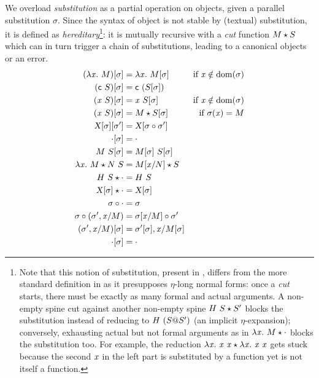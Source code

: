 \documentclass{llncs}
\begin{document}
We overload \emph{substitution} as a partial operation on objects,
given a parallel substitution $\sigma$. Since the syntax of object is
not stable by (textual) substitution, it is defined as
\emph{hereditary}\footnote{ Note that this notion of substitution,
  present in \cite{pfenning2007term}, differs from the more standard
  definition in \cite{hl07mechanizing} as it presupposes $\eta$-long
  normal forms: once a \emph{cut} starts, there must be exactly as
  many formal and actual arguments. A non-empty spine cut against
  another non-empty spine ${{H}\  S}\star{S'}$ blocks the
  substitution instead of reducing to ${H}\  {({S}@{S}')}$ (an
  implicit $\eta$-expansion); conversely, exhausting actual but not
  formal arguments as in ${\lambda{\ensuremath{\text{\textit{x}}}}.\  M}\star{\cdot}$ blocks the
  substitution too. For example, the reduction ${\lambda{\ensuremath{\text{\textit{x}}}}.\  {\text{\textit{x}}}\ {\text{\textit{x}}}}\star{\lambda{\ensuremath{\text{\textit{x}}}}.\ {\ensuremath{\text{\textit{x}}}}\ {\ensuremath{\text{\textit{x}}}}}$ gets stuck
  because the second $\text{\textit{x}}$ in the left part is substituted by a
  function yet is not itself a function. }: it is mutually recursive
with a \emph{cut} function ${M}\star{S}$ which can in turn trigger a
chain of substitutions, leading to a canonical objects or an error.
\begin{align*}
  {(\lambda{\ensuremath{\text{\textit{x}}}}.\ M)}[{\sigma}] &= \lambda{\ensuremath{\text{\textit{x}}}}.\  {{M}[{\sigma}]} &
  \text{if $\text{\textit{x}}\notin \operatorname{dom}{\!(\sigma)}$}
  \\
  {({\text{\textsf{c}}}\  S)}[{\sigma}] &= {\text{\textsf{c}}}\  {({S}[{\sigma}])}
  \\
  {({\text{\textit{x}}}\  S)}[{\sigma}] &=
  {\text{\textit{x}}}\  {{S}[{\sigma}]} &
  \text{if $\text{\textit{x}}\notin \operatorname{dom}{\!(\sigma)}$}
  \\
  {({\text{\textit{x}}}\  S)}[{\sigma}] &=
  {M}\star{{S}[{\sigma}]} &
  \text{if $\sigma(\text{\textit{x}}) = M$}
  \\
  {{\text{\textsl{X}}}[{\sigma}]}[{\sigma'}] &=
  {\text{\textsl{X}}}[{{\sigma}\circ{\sigma'}}]
  \\
  {\cdot}[{\sigma}] &=
  \cdot \\
  {{M}\ {S}}[{\sigma}] &=
  {{M}[{\sigma}]}\ {{S}[{\sigma}]}
  \\
  {\lambda{\ensuremath{\text{\textit{x}}}}.\  M}\star{{N}\ {S}} &=
  {{M}[{{\text{\textit{x}}}/{N}}]}\star{S}
  \\
  {{H}\  S}\star{\cdot} &=
  {H}\  S
  \\
  {{\text{\textsl{X}}}[{\sigma}]}\star{\cdot} &= {\text{\textsl{X}}}[{\sigma}]
  \\
  {\sigma}\circ{\cdot} &=
  \sigma
  \\
  {\sigma}\circ{({\sigma'},{{\ensuremath{\text{\textit{x}}}}/{M}})} &=
  {{\sigma}[{{\text{\textit{x}}}/{M}}]}\circ{\sigma}'
  \\
  {({\sigma'},{{\text{\textit{x}}}/{M}})}[{\sigma}] &=
  {{\sigma'}[{\sigma}]},{{\text{\textit{x}}}/{{M}[{\sigma}]}}
  \\
  {\cdot}[{\sigma}] &= \cdot
\end{align*}
\end{document}
